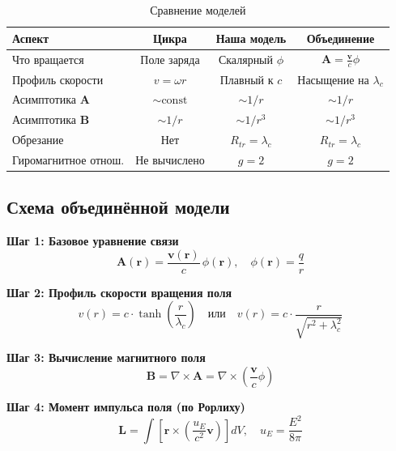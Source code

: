 \documentclass[12pt,a4paper]{article}
\begin{document}
\begin{table}[h]
\centering
\caption{Сравнение моделей}
\label{tab:models}
\begin{tabular}{lccc}
\toprule
\textbf{Аспект} & \textbf{Цикра} & \textbf{Наша модель} & \textbf{Объединение} \\
\midrule
Что вращается & Поле заряда & Скалярный $\phi$ & $\mathbf{A} = \frac{\mathbf{v}}{c}\phi$ \\
Профиль скорости & $v = \omega r$ & Плавный к $c$ & Насыщение на $\lambda_c$ \\
Асимптотика $\mathbf{A}$ & $\sim \text{const}$ & $\sim 1/r$ & $\sim 1/r$ \\
Асимптотика $\mathbf{B}$ & $\sim 1/r$ & $\sim 1/r^3$ & $\sim 1/r^3$ \\
Обрезание & Нет & $R_{tr} = \lambda_c$ & $R_{tr} = \lambda_c$ \\
Гиромагнитное отнош. & Не вычислено & $g = 2$ & $g = 2$ \\
\bottomrule
\end{tabular}
\end{table}

\subsection{Схема объединённой модели}

\textbf{Шаг 1: Базовое уравнение связи}
\begin{equation}
    \mathbf{A}(\mathbf{r}) = \frac{\mathbf{v}(\mathbf{r})}{c} \, \phi(\mathbf{r}), \quad \phi(\mathbf{r}) = \frac{q}{r}
\end{equation}

\textbf{Шаг 2: Профиль скорости вращения поля}
\begin{equation}
    v(r) = c \cdot \tanh\left(\frac{r}{\lambda_c}\right) \quad \text{или} \quad v(r) = c \cdot \frac{r}{\sqrt{r^2 + \lambda_c^2}}
\end{equation}

\textbf{Шаг 3: Вычисление магнитного поля}
\begin{equation}
    \mathbf{B} = \nabla \times \mathbf{A} = \nabla \times \left( \frac{\mathbf{v}}{c} \phi \right)
\end{equation}

\textbf{Шаг 4: Момент импульса поля (по Рорлиху)}
\begin{equation}
    \mathbf{L} = \int \left[ \mathbf{r} \times \left( \frac{u_E}{c^2} \mathbf{v} \right) \right] dV, \quad u_E = \frac{E^2}{8\pi}
\end{equation}
\end{document}
